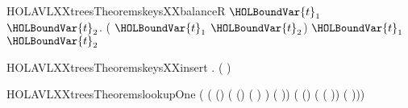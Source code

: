 \newcommand{\HOLAVLXXtreesTheoremskeysXXbalanceL}{\UseVerbatim{HOLAVLXXtreesTheoremskeysXXbalanceL}}
\begin{SaveVerbatim}{HOLAVLXXtreesTheoremskeysXXbalanceR}
\HOLTokenTurnstile{} \HOLSymConst{\HOLTokenForall{}}  \ensuremath{\HOLBoundVar{t}\sb{\mathrm{1}}} \ensuremath{\HOLBoundVar{t}\sb{\mathrm{2}}}.
      (   \ensuremath{\HOLBoundVar{t}\sb{\mathrm{1}}} \ensuremath{\HOLBoundVar{t}\sb{\mathrm{2}}}) \HOLSymConst{=} \HOLTokenLeftbrace{}\HOLTokenRightbrace{} \HOLConst{\HOLTokenUnion{}}  \ensuremath{\HOLBoundVar{t}\sb{\mathrm{1}}} \HOLConst{\HOLTokenUnion{}}  \ensuremath{\HOLBoundVar{t}\sb{\mathrm{2}}}
\end{SaveVerbatim}
\newcommand{\HOLAVLXXtreesTheoremskeysXXbalanceR}{\UseVerbatim{HOLAVLXXtreesTheoremskeysXXbalanceR}}
\begin{SaveVerbatim}{HOLAVLXXtreesTheoremskeysXXinsert}
\HOLTokenTurnstile{} \HOLSymConst{\HOLTokenForall{}}  .  (   ) \HOLSymConst{=}   \HOLConst{\HOLTokenUnion{}} \HOLTokenLeftbrace{}\HOLTokenRightbrace{}
\end{SaveVerbatim}
\newcommand{\HOLAVLXXtreesTheoremskeysXXinsert}{\UseVerbatim{HOLAVLXXtreesTheoremskeysXXinsert}}
\begin{SaveVerbatim}{HOLAVLXXtreesTheoremslookupOne}
\HOLTokenTurnstile{}  
     (   
        ( (\HOLSymConst{\ensuremath{-}})   ( (\HOLSymConst{\ensuremath{-}})   (     ) )
           (     ))
        ( (\HOLSymConst{\ensuremath{-}})   (     (     ))
           (     ))) \HOLSymConst{=}
    
\end{SaveVerbatim}
\newcommand{\HOLAVLXXtreesTheoremslookupOne}{\UseVerbatim{HOLAVLXXtreesTheoremslookupOne}}
